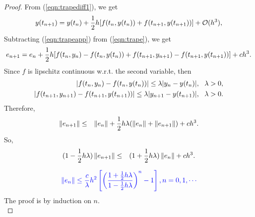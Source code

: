 \documentclass[12pt]  {article}%
\begin{document}
\begin{proof}
From (\ref{eqn:trapediff1}), we get
 \begin{eqnarray}\label{eqn:trapeapp}
 y(t_{n+1})=y(t_n)+\frac{1}{2}h [f(t_n,y(t_n))+f(t_{n+1},y(t_{n+1}))]+\mathcal{O}{(h^3)},
\end{eqnarray}
Subtracting (\ref{eqn:trapeapp}) from (\ref{eqn:trape}), we get
 \begin{eqnarray}\label{eqn:feulerdiff}
 e_{n+1}=e_{n}+\frac{1}{2}h [f(t_n,y_n)-f(t_n,y(t_n))+f(t_{n+1},y_{n+1})-f(t_{n+1},y(t_{n+1}))]+ch^3.
\end{eqnarray}
Since $f$ is lipschitz continuous w.r.t. the second variable, then
 \begin{eqnarray}
|f(t_n,y_n)-f(t_n,y(t_{n}))| \leq \lambda |y_n-y(t_{n})|,~~\lambda>0,\\
|f(t_{n+1},y_{n+1})-f(t_{n+1},y(t_{n+1}))| \leq \lambda |y_{n+1}-y(t_{n+1})|,~~\lambda>0.
\end{eqnarray}
Therefore,
 \begin{eqnarray}
 \left\|e_{n+1}\right\|&\leq& \left\|e_n\right\|+\frac{1}{2}h\lambda(\left\|e_n\right\|+\left\|e_{n+1}\right\|)+ch^3.
\end{eqnarray}
So,
 \begin{eqnarray}
 (1-\frac{1}{2}h\lambda)\left\|e_{n+1}\right\|&\leq&(1+\frac{1}{2}h\lambda) \left\|e_n\right\|+ch^3.
\end{eqnarray}

\begin{eqnarray}\label{eqn:claimtrape}
\textcolor{blue}{\left\|e_n\right\| \leq \frac{c}{\lambda}h^2\left[\left(\frac{1+\frac{1}{2}h\lambda}{1-\frac{1}{2}h\lambda}\right)^n-1\right], n=0,1,\cdots}
\end{eqnarray}
The proof is by induction on $n$.\\


\end{proof}
\end{document}

